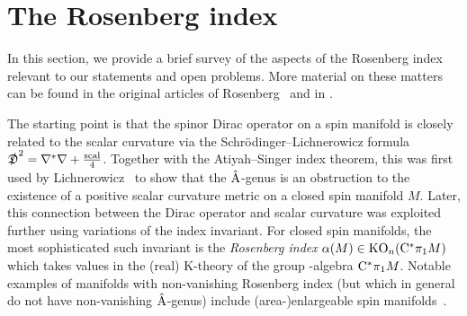 \documentclass[11pt]{article}
\DeclareMathOperator{\scal}{scal}
\DeclareMathOperator{\KO}{KO}
\numberwithin{equation}{section}
\begin{document}
\setcounter{section}{1}
\setcounter{subsection}{0}
\setcounter{subsubsection}{0}
\setcounter{Theorem}{6}
\setcounter{equation}{1}
\section{The Rosenberg index} \label{sec:Rosenberg-index}
In this section, we provide a brief survey of the aspects of the Rosenberg index relevant to our statements and open problems.
More material on these matters can be found in the original articles of Rosenberg~\cite{Rosenberg:PSCNovikovI,Rosenberg:PSCNovikovII,Rosenberg:PSCNovikovIII} and in \cite{RosenbergStolz:PSCSurgeryConnections,Schick:ICM,Stolz:ManifoldsOfPSC,Stolz98Concordance}.

The starting point is that the spinor Dirac operator on a spin manifold is closely related to the scalar curvature via the Schr\"odinger--Lichnerowicz formula \(\Dirac^2 = \nabla^\ast \nabla + \frac{\scal}{4}\).
Together with the Atiyah--Singer index theorem, this was first used by Lichnerowicz~\cite{Lichnerwociz:Spineurs} to show that the \(\hat{\mathrm{A}}\)-genus is an obstruction to the existence of a positive scalar curvature metric on a closed spin manifold \(M\).
Later, this connection between the Dirac operator and scalar curvature was exploited further using variations of the index invariant.
For closed spin manifolds, the most sophisticated such invariant is the \emph{Rosenberg index} \(\alpha(M) \in \KO_n(\Cstar \pi_1 M)\) which takes values in the (real) K-theory of the group \textCstar-algebra \(\mathrm{C}^\ast \pi_1 M\).
Notable examples of manifolds with non-vanishing Rosenberg index (but which in general do not have non-vanishing \(\hat{\mathrm{A}}\)-genus) include (area-)enlargeable spin manifolds~\cite{Hanke-Kotschick-Roe-Schick:Coarse-Top-Enlargeability, HankeSchick:Enlargeable,HankeSchick:EnlargeableInfinite}.
\end{document}
